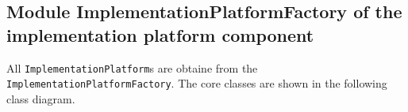 \documentclass[11pt,a4paper]{article}
\begin{document}
\subsection{Module ImplementationPlatformFactory of the implementation platform 
component}
\label{sec:mod-impl-platform-factory}

All \texttt{ImplementationPlatform}s are obtaine from the 
\texttt{Implementation\-Platform\-Factory}. The core classes are shown in the
following class diagram.

\begin{center}
\end{center}
\end{document}
